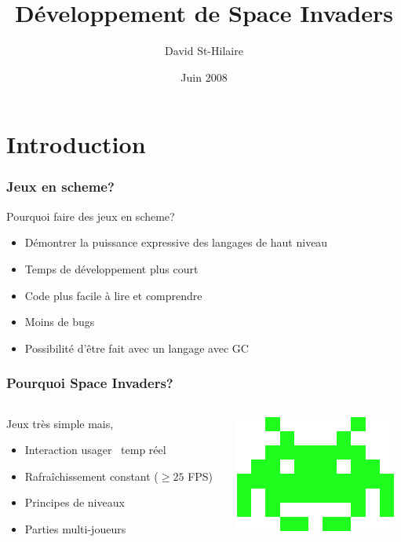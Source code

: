 \documentclass{beamer}
\title{Développement de Space Invaders}
\author{David St-Hilaire}
\date{Juin 2008}
\newcommand{\<}[1]{\`#1}
\begin{document}
\begin{frame}
\titlepage
\end{frame}


\section{Introduction}

\begin{frame}
  \frametitle{Jeux en scheme?}
  Pourquoi faire des jeux en scheme?
  \begin{itemize}
  \item Démontrer la puissance expressive des langages de haut
    niveau
  \item Temps de développement plus court
  \item Code plus facile à lire et comprendre
  \item Moins de bugs
  \item Possibilité d'être fait avec un langage avec GC
  \end{itemize}
\end{frame}

\begin{frame}
  \frametitle{Pourquoi Space Invaders?}

  \begin{columns}[c]
    \begin{column}{7cm} 
      Jeux très simple mais,
      \begin{itemize}
      \item Interaction usager ~temp réel
      \item Rafraîchissement constant ($\ge 25$ FPS)
      \item Principes de niveaux
      \item Parties multi-joueurs
      \end{itemize}
    \end{column}
    \begin{column}{5cm} \includegraphics[scale=0.5]{medium} \end{column}
  \end{columns}
\end{frame}
\end{document}
